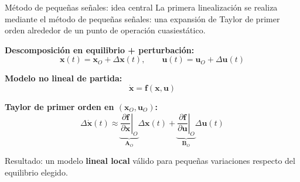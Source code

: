\documentclass[aspectratio=169,t]{beamer}
\begin{document}
\begin{frame}{Método de pequeñas señales: idea central}
{\small\color{uncGray}La primera linealización se realiza mediante el método de pequeñas señales: una expansión de Taylor de primer orden alrededor de un punto de operación cuasiestático.}\par
\vspace{3mm}

\textbf{Descomposición en equilibrio + perturbación:}
\begin{equation*}
\bm{x}(t)=\bm{x}_O+\Delta\bm{x}(t),
\qquad
\bm{u}(t)=\bm{u}_O+\Delta\bm{u}(t)
\end{equation*}

\textbf{Modelo no lineal de partida:}
\begin{equation*}
\dot{\bm{x}}=\bm{f}(\bm{x},\bm{u})
\end{equation*}

\textbf{Taylor de primer orden en $(\bm{x}_O,\bm{u}_O)$:}
\begin{equation*}
\Delta\dot{\bm{x}}(t)\approx
\underbrace{\left.\frac{\partial \bm{f}}{\partial \bm{x}}\right|_O}_{\bm{A}_O}
\Delta\bm{x}(t)+
\underbrace{\left.\frac{\partial \bm{f}}{\partial \bm{u}}\right|_O}_{\bm{B}_O}
\Delta\bm{u}(t)
\end{equation*}

{\small Resultado: un modelo \textbf{lineal local} válido para pequeñas variaciones respecto del equilibrio elegido.}
\end{frame}
\end{document}
